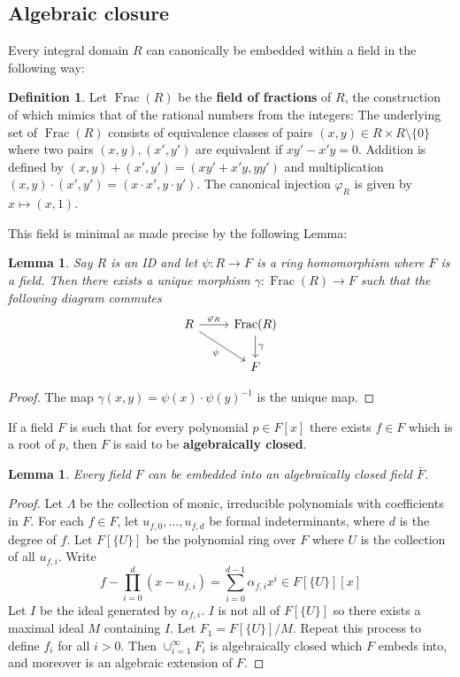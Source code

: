 \documentclass[12pt]{article}
\theoremstyle{plain}
\newtheorem{lemma}[thm]{Lemma}
\theoremstyle{definition}
\newtheorem{defn}[thm]{Definition} %
\begin{document}
	\subsection{Algebraic closure}
	\label{sec:fieldextensions}%
	Every integral domain $R$ can canonically be embedded within a field in the following way:
	\begin{defn}
		Let $\operatorname{Frac}(R)$ be the \textbf{field of fractions} of $R$, the construction of which mimics that of the rational numbers from the integers: The underlying set of $\operatorname{Frac}(R)$ consists of equivalence classes of pairs $(x,y) \in R\times R\setminus\lbrace 0 \rbrace$ where two pairs $(x,y),(x',y')$ are equivalent if $xy' - x'y = 0$. Addition is defined by $(x,y) + (x',y') = (xy' + x'y,yy')$ and multiplication $(x,y)\cdot(x',y') = (x\cdot x',y\cdot y')$. The canonical injection $\varphi_R$ is given by $x \mapsto (x,1)$.
	\end{defn}
	This field is minimal as made precise by the following Lemma:
	\begin{lemma}
		\label{uniquenessoffff}
		Say $R$ is an ID and let $\psi: R \to F$ is a ring homomorphism where $F$ is a field. Then there exists a unique morphism $\gamma: \operatorname{Frac}(R) \to F$ such that the following diagram commutes
		\[
		\begin{tikzcd}
			R\arrow[r,"{\varphi_R}"]\arrow[dr,swap,"{\psi}"] & \operatorname{Frac}(R)\arrow[d,"{\gamma}"]\\
			& F
		\end{tikzcd}
		\]
	\end{lemma}
	\begin{proof}
		The map $\gamma(x,y) = \psi(x)\cdot\psi(y)^{-1}$ is the unique map.
	\end{proof}
	If a field $F$ is such that for every polynomial $p \in F[x]$ there exists $f \in F$ which is a root of $p$, then $F$ is said to be \textbf{algebraically closed}.
	\begin{lemma}
		\label{algebraicclosure}
		Every field $F$ can be embedded into an algebraically closed field $\bar{F}$.
	\end{lemma}
	\begin{proof}
		Let $\Lambda$ be the collection of monic, irreducible polynomials with coefficients in $F$. For each $f \in F$, let $u_{f,0},...,u_{f,d}$ be formal indeterminants, where $d$ is the degree of $f$. Let $F[\lbrace U\rbrace]$ be the polynomial ring over $F$ where $U$ is the collection of all $u_{f,i}$. Write
		\[f - \prod_{i = 0}^d(x - u_{f,i}) = \sum_{i = 0}^{d-1}\alpha_{f,i}x^i \in F[\lbrace U \rbrace][x]\]
		Let $I$ be the ideal generated by $\alpha_{f,i}$. $I$ is not all of $F[\lbrace U \rbrace]$ so there exists a maximal ideal $M$ containing $I$. Let $F_1 = F[\lbrace U \rbrace]/M$. Repeat this process to define $f_i$ for all $i > 0$. Then $\cup_{i = 1}^\infty F_i$ is algebraically closed which $F$ embeds into, and moreover is an algebraic extension of $F$.
	\end{proof}
\end{document}

